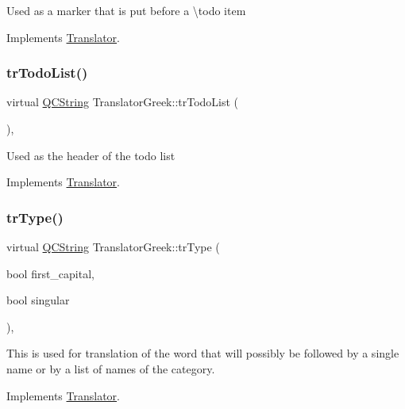 Used as a marker that is put before a \textbackslash{}todo item 

Implements \mbox{\hyperlink{class_translator}{Translator}}.

\mbox{\label{class_translator_greek_a8fbef85f69b94ea042894fee635664ba}} 
\subsubsection{\texorpdfstring{trTodoList()}{trTodoList()}}
{\footnotesize\ttfamily virtual \mbox{\hyperlink{class_q_c_string}{Q\+C\+String}} Translator\+Greek\+::tr\+Todo\+List (\begin{DoxyParamCaption}{ }\end{DoxyParamCaption})\hspace{0.3cm}{\ttfamily [inline]}, {\ttfamily [virtual]}}

Used as the header of the todo list 

Implements \mbox{\hyperlink{class_translator}{Translator}}.

\mbox{\label{class_translator_greek_a81b20626140b61ce3826c7792dde2428}} 
\subsubsection{\texorpdfstring{trType()}{trType()}}
{\footnotesize\ttfamily virtual \mbox{\hyperlink{class_q_c_string}{Q\+C\+String}} Translator\+Greek\+::tr\+Type (\begin{DoxyParamCaption}\item[{bool}]{first\+\_\+capital,  }\item[{bool}]{singular }\end{DoxyParamCaption})\hspace{0.3cm}{\ttfamily [inline]}, {\ttfamily [virtual]}}

This is used for translation of the word that will possibly be followed by a single name or by a list of names of the category. 

Implements \mbox{\hyperlink{class_translator}{Translator}}.

\mbox{\label{class_translator_greek_ab3b7298a2ed8b1b269b74b2cbfd03113}} 
